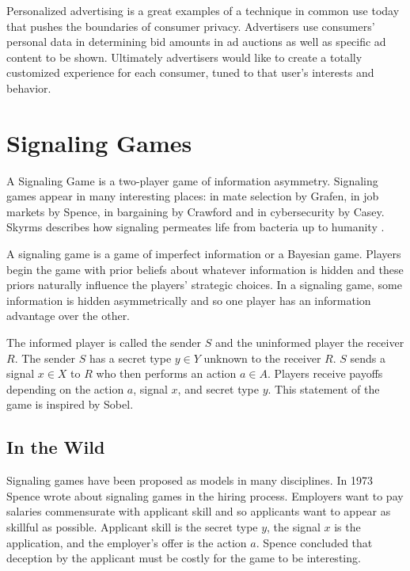 \documentclass{article}
\begin{document}
Personalized advertising is a great examples of a technique in common use today that pushes the boundaries of consumer privacy. Advertisers use consumers' personal data in determining bid amounts in ad auctions as well as specific ad content to be shown. Ultimately advertisers would like to create a totally customized experience for each consumer, tuned to that user's interests and behavior.

\section{Signaling Games}

A Signaling Game is a two-player game of information asymmetry. Signaling games appear in many interesting places: in mate selection by Grafen\cite{grafen1}, in job markets by Spence\cite{spence1973job}, in bargaining by Crawford\cite{crawford1982strategic} and in cybersecurity by Casey\cite{casey1}\cite{casey2}\cite{casey3}. Skyrms describes how signaling permeates life from bacteria up to humanity \cite{skyrms2010signals}.

A signaling game is a game of imperfect information or a Bayesian game\cite{harsanyi2004games}. Players begin the game with prior beliefs about whatever information is hidden and these priors naturally influence the players' strategic choices. In a signaling game, some information is hidden asymmetrically and so one player has an information advantage over the other. 

The informed player is called the sender $S$ and the uninformed player the receiver $R$. The sender $S$ has a secret type $y \in Y$ unknown to the receiver $R$. $S$ sends a signal $x \in X$ to $R$ who then performs an action $a \in A$. Players receive payoffs depending on the action $a$, signal $x$, and secret type $y$. This statement of the game is inspired by Sobel\cite{sobel1}.

\subsection{In the Wild}

Signaling games have been proposed as models in many disciplines. In 1973 Spence wrote about signaling games in the hiring process\cite{spence1973job}. Employers want to pay salaries commensurate with applicant skill and so applicants want to appear as skillful as possible. Applicant skill is the secret type $y$, the signal $x$ is the application, and the employer's offer is the action $a$. Spence concluded that deception by the applicant must be costly for the game to be interesting.
\end{document}
